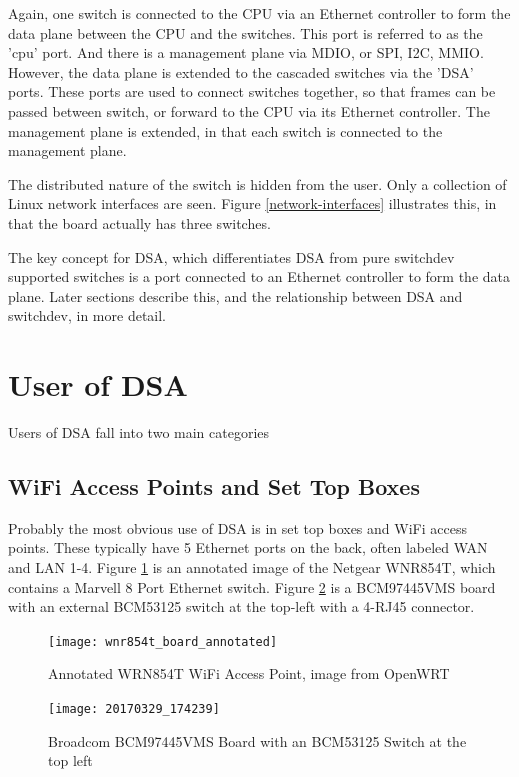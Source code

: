 \documentclass[letterpaper]{article}
\begin{document}
Again, one switch is connected to the CPU via an Ethernet controller
to form the data plane between the CPU and the switches. This port is
referred to as the 'cpu' port. And there is a management plane via
MDIO, or SPI, I2C, MMIO. However, the data plane is extended to the
cascaded switches via the 'DSA' ports. These ports are used to connect
switches together, so that frames can be passed between switch, or
forward to the CPU via its Ethernet controller. The management plane
is extended, in that each switch is connected to the management plane.

The distributed nature of the switch is hidden from the user. Only a
collection of Linux network interfaces are seen. Figure
\ref{network-interfaces} illustrates this, in that the board actually
has three switches.

The key concept for DSA, which differentiates DSA from pure switchdev
supported switches is a port connected to an Ethernet controller to
form the data plane. Later sections describe this, and the
relationship between DSA and switchdev, in more detail.

\section{User of DSA}

Users of DSA fall into two main categories

\subsection{WiFi Access Points and Set Top Boxes}

Probably the most obvious use of DSA is in set top boxes and WiFi
access points. These typically have 5 Ethernet ports on the back,
often labeled WAN and LAN 1-4. Figure \ref{wrn854t} is an annotated
image of the Netgear WNR854T, which contains a Marvell 8 Port Ethernet
switch. Figure \ref{BCM97445VMS} is a BCM97445VMS board with an
external BCM53125 switch at the top-left with a 4-RJ45 connector.

\begin{figure}[ht]
  \centering
  \texttt{[image: wnr854t\_board\_annotated]}
  \caption{Annotated WRN854T WiFi Access Point, image from OpenWRT}
  \label{wrn854t}
\end{figure}

\begin{figure}[ht]
  \centering
  \texttt{[image: 20170329\_174239]}
  \caption{Broadcom BCM97445VMS Board with an BCM53125 Switch at the top left}
  \label{BCM97445VMS}
\end{figure}
\end{document}

